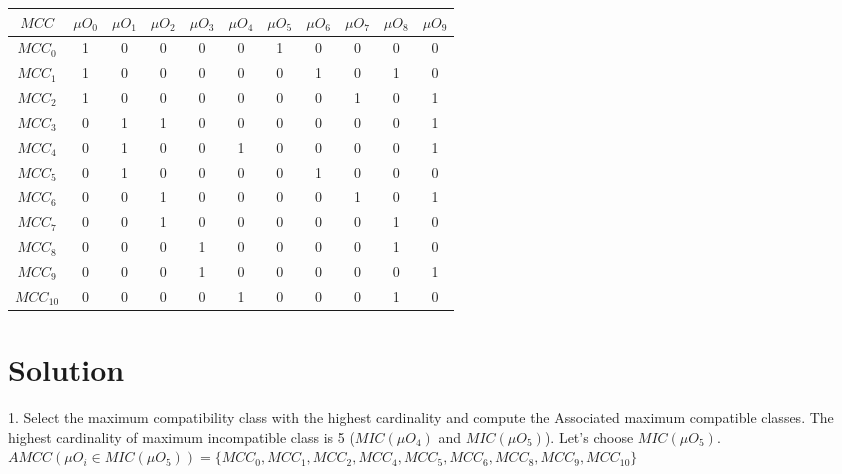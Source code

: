 \begin{table}[H]
    \centering
        \begin{tabular}{|c|c|c|c|c|c|c|c|c|c|c|}
            \hline
            $MCC$ & $\mu O_{0}$ & $\mu O_{1}$ & $\mu O_{2}$ & $\mu O_{3}$ & $\mu O_{4}$ & $\mu O_{5}$ & $\mu O_{6}$ & $\mu O_{7}$ & $\mu O_{8}$ & $\mu O_{9}$ \\ \hline
            $MCC_{0}$ & 1 & 0 & 0 & 0 & 0 & 1 & 0 & 0 & 0 & 0 \\ \hline
            $MCC_{1}$ & 1 & 0 & 0 & 0 & 0 & 0 & 1 & 0 & 1 & 0 \\ \hline
            $MCC_{2}$ & 1 & 0 & 0 & 0 & 0 & 0 & 0 & 1 & 0 & 1 \\ \hline
            $MCC_{3}$ & 0 & 1 & 1 & 0 & 0 & 0 & 0 & 0 & 0 & 1 \\ \hline
            $MCC_{4}$ & 0 & 1 & 0 & 0 & 1 & 0 & 0 & 0 & 0 & 1 \\ \hline
            $MCC_{5}$ & 0 & 1 & 0 & 0 & 0 & 0 & 1 & 0 & 0 & 0 \\ \hline
            $MCC_{6}$ & 0 & 0 & 1 & 0 & 0 & 0 & 0 & 1 & 0 & 1 \\ \hline
            $MCC_{7}$ & 0 & 0 & 1 & 0 & 0 & 0 & 0 & 0 & 1 & 0 \\ \hline
            $MCC_{8}$ & 0 & 0 & 0 & 1 & 0 & 0 & 0 & 0 & 1 & 0 \\ \hline
            $MCC_{9}$ & 0 & 0 & 0 & 1 & 0 & 0 & 0 & 0 & 0 & 1 \\ \hline
            $MCC_{10}$ & 0 & 0 & 0 & 0 & 1 & 0 & 0 & 0 & 1 & 0 \\ \hline
        \end{tabular}
\end{table}

\section*{Solution}

1. Select the maximum compatibility class with the highest cardinality and compute the Associated maximum compatible classes.
The highest cardinality of maximum incompatible class is 5 ($MIC(\mu O_{4})$ and $MIC(\mu O_{5})$).
Let's choose $MIC(\mu O_{5})$.
    $AMCC(\mu O_{i} \in MIC(\mu O_{5})) = \{ MCC_{0}, MCC_{1}, MCC_{2}, MCC_{4}, MCC_{5}, MCC_{6}, MCC_{8}, MCC_{9}, MCC_{10}\}$
    
